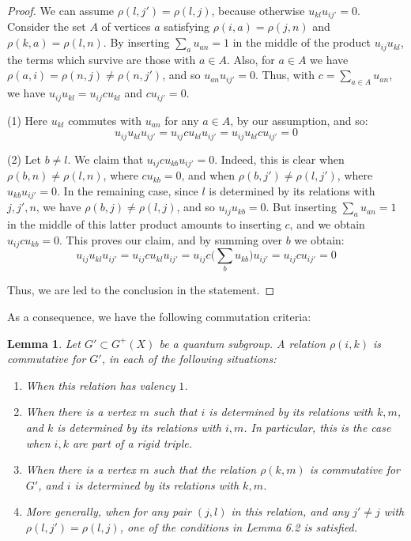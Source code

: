 \documentclass[11pt]{amsart}
\newtheorem{lemma}[theorem]{Lemma}
\begin{document}
\begin{proof}
We can assume $\rho(l,j')=\rho(l,j)$, because otherwise $u_{kl}u_{ij'}=0$. Consider the set $A$ of vertices $a$ satisfying $\rho(i,a)=\rho(j,n)$ and $\rho(k,a)=\rho(l,n)$. By inserting $\sum_au_{an}=1$ in the middle of the product $u_{ij}u_{kl}$, the terms which survive are those with $a\in A$. Also, for $a\in A$ we have $\rho(a,i)=\rho(n,j)\neq\rho(n,j')$, and so $u_{an}u_{ij'}=0$. Thus, with $c=\sum_{a\in A}u_{an}$, we have $u_{ij}u_{kl}=u_{ij}cu_{kl}$ and $cu_{ij'}=0$.

(1) Here $u_{kl}$ commutes with $u_{an}$ for any $a\in A$, by our assumption, and so:
$$u_{ij}u_{kl}u_{ij'}=u_{ij}cu_{kl}u_{ij'}=u_{ij}u_{kl}cu_{ij'}=0$$

(2) Let $b\neq l$. We claim that $u_{ij}cu_{kb}u_{ij'}=0$. Indeed, this is clear when $\rho(b,n)\neq\rho(l,n)$, where $cu_{kb}=0$, and when $\rho(b,j')\neq\rho(l,j')$, where $u_{kb}u_{ij'}=0$. In the remaining case, since $l$ is determined by its relations with $j,j',n$, we have $\rho(b,j)\neq\rho(l,j)$, and so $u_{ij}u_{kb}=0$. But inserting $\sum_au_{an}=1$ in the middle of this latter product amounts to inserting $c$, and we obtain $u_{ij}cu_{kb}=0$. This proves our claim, and by summing over $b$ we obtain:
$$u_{ij}u_{kl}u_{ij'}=u_{ij}cu_{kl}u_{ij'}=u_{ij}c\Big(\sum_bu_{kb}\Big)u_{ij'}=u_{ij}cu_{ij'}=0$$

Thus, we are led to the conclusion in the statement.
\end{proof}

As a consequence, we have the following commutation criteria:

\begin{lemma}
Let $G'\subset G^+(X)$ be a quantum subgroup. A relation $\rho(i,k)$ is commutative for $G'$, in each of the following situations:
\begin{enumerate}
\item When this relation has valency $1$.
\item When there is a vertex $m$ such that $i$ is determined by its relations with $k,m$, and $k$ is determined by its relations with $i,m$. In particular, this is the case when $i,k$ are part of a rigid triple.
\item When there is a vertex $m$ such that the relation $\rho(k,m)$ is commutative for $G'$, and $i$ is determined by its relations with $k,m$.
\item More generally, when for any pair $(j,l)$ in this relation, and any $j'\neq j$ with $\rho(l,j')=\rho(l,j)$, one of the conditions in Lemma 6.2 is satisfied.
\end{enumerate}
\end{lemma}
\end{document}
